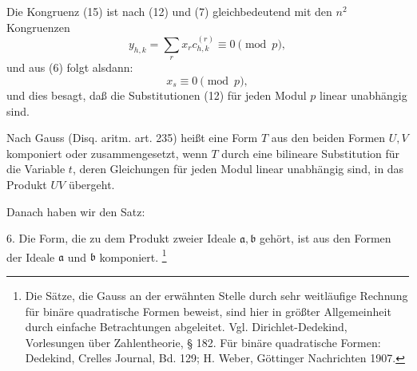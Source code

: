 \documentclass[11pt]{article}
\begin{document}
Die Kongruenz (15) ist nach (12) und (7) gleichbedeutend mit den $n^2$ Kongruenzen
\[
 y_{h,k}=\sum_r x_rc_{h,k}^{(r)}\equiv0\pmod p,
\]
und aus (6) folgt alsdann:
\[
 x_s\equiv0\pmod p,
\]
und dies besagt, daß die Substitutionen (12) für jeden Modul $p$ linear unabhängig sind.

Nach Gauss (Disq. aritm. art. 235) heißt eine Form $T$ aus den beiden Formen $U,V$ komponiert oder zusammengesetzt, wenn $T$ durch eine bilineare Substitution für die Variable $t$, deren Gleichungen für jeden Modul linear unabhängig sind, in das Produkt $UV$ übergeht.

Danach haben wir den Satz:

6. Die Form, die zu dem Produkt zweier Ideale $\mathfrak a,\mathfrak b$ gehört, ist aus den Formen der Ideale $\mathfrak a$ und $\mathfrak b$ komponiert.
\footnote{Die Sätze, die Gauss an der erwähnten Stelle durch sehr weitläufige Rechnung für binäre quadratische Formen beweist, sind hier in größter Allgemeinheit durch einfache Betrachtungen abgeleitet. Vgl. Dirichlet-Dedekind, Vorlesungen über Zahlentheorie, § 182. Für binäre quadratische Formen: Dedekind, Crelles Journal, Bd. 129; H. Weber, Göttinger Nachrichten 1907.}
\end{document}
